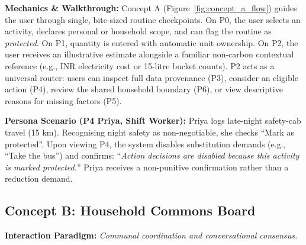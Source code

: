 \documentclass[12pt,a4paper]{article}
\begin{document}
\textbf{Mechanics \& Walkthrough:} Concept A (Figure~\ref{fig:concept_a_flow}) guides the user through single, bite-sized routine checkpoints. On P0, the user selects an activity, declares personal or household scope, and can flag the routine as \emph{protected}. On P1, quantity is entered with automatic unit ownership. On P2, the user receives an illustrative estimate alongside a familiar non-carbon contextual reference (e.g., INR electricity cost or 15-litre bucket counts). P2 acts as a universal router: users can inspect full data provenance (P3), consider an eligible action (P4), review the shared household boundary (P6), or view descriptive reasons for missing factors (P5).

\textbf{Persona Scenario (P4 Priya, Shift Worker):} Priya logs late-night safety-cab travel (15 km). Recognising night safety as non-negotiable, she checks ``Mark as protected''. Upon viewing P4, the system disables substitution demands (e.g., ``Take the bus'') and confirms: ``\emph{Action decisions are disabled because this activity is marked protected.}'' Priya receives a non-punitive confirmation rather than a reduction demand.

\subsection{Concept B: Household Commons Board}
\textbf{Interaction Paradigm:} \emph{Communal coordination and conversational consensus.}
\end{document}
